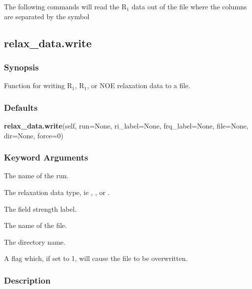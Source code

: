 The following commands will read the R$_1$ data out of the file  where the columns are separated by the symbol \quotecmd{\%} 
  


  

 \newpage 

 \subsection{relax\_data.write} 

  
 \subsubsection{Synopsis} 

 Function for writing R$_1$, R$_1$, or NOE relaxation data to a file. 
  

  
 \subsubsection{Defaults} 

 \textsf{\textbf{relax\_data.write}(self, run=None, ri\_label=None, frq\_label=None, file=None, dir=None, force=0)} 

  
 \subsubsection{Keyword Arguments} 

   The name of the run.   

   The relaxation data type, ie , , or .   

   The field strength label.   

   The name of the file.   

   The directory name.   

   A flag which, if set to 1, will cause the file to be overwritten.  

  

  
 \subsubsection{Description} 


